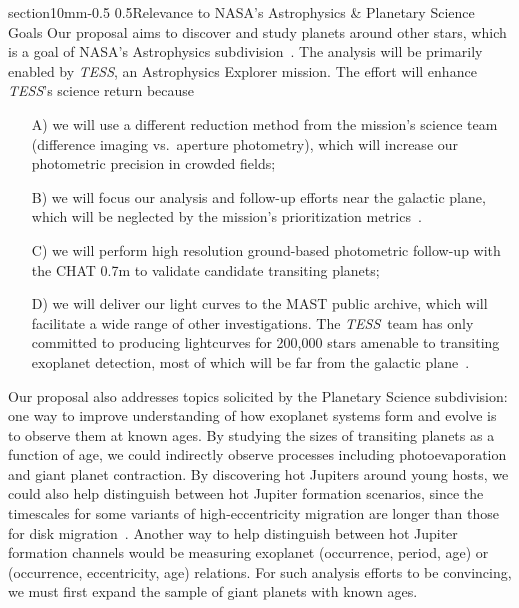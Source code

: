 \documentclass[letterpaper,11pt]{article}
\makeatletter
\renewcommand\section{\@startsection%
{section}{1}{0mm}{-0.5\baselineskip}%
{0.5\baselineskip}{\normalfont\normalsize\bfseries}}%
\newcommand{\tess}{{\it TESS}}
\makeatother
\begin{document}
\vspace{-0.3mm}
\section{Relevance to NASA's Astrophysics \& Planetary Science Goals}
\vspace{-0.3mm}
Our proposal aims to discover and study planets around other stars, 
which is a goal of NASA's Astrophysics 
subdivision~\citep[][Ch.~4.4]{NASA_strategic_2014}. 
The analysis will be primarily enabled by \tess, an Astrophysics Explorer 
mission.
The effort will enhance \tess's science return because
\begin{itemize}
\item[A)] we will use a different reduction method from the mission's 
science team (difference imaging vs.~aperture photometry),
which will increase our photometric precision in crowded fields;
\vspace{-0.4mm}
%
\item[B)] we will focus our analysis and follow-up efforts near the 
galactic plane, which will be neglected by the mission's prioritization 
metrics~\citep{Stassun_et_al_2017}. 
%
\item[C)] we will perform high resolution ground-based photometric follow-up 
with the CHAT 0.7m to validate candidate transiting planets;
%
\item[D)] we will deliver our light curves to the MAST public archive, 
which will facilitate a wide range of other investigations. The \tess\ team 
has only committed to producing lightcurves for 200,000 stars amenable to 
transiting exoplanet detection, most of which will be far from the galactic 
plane~\citep{Stassun_et_al_2017}. 
\vspace{-0.4mm}
%
\
\end{itemize}

Our proposal also addresses topics solicited by the Planetary Science 
subdivision: one way to improve understanding of how exoplanet systems form 
and evolve is to observe them at known ages. 
By studying the sizes of transiting planets as a function of age, 
we could indirectly observe processes including photoevaporation and giant 
planet contraction.
By discovering hot Jupiters around young hosts, we could also
help distinguish between hot Jupiter formation scenarios, since the timescales 
for some variants of high-eccentricity migration are longer than those for 
disk migration~\citep[\textit{e.g.},][]{dawson_origins_2018}.
Another way to help distinguish between hot Jupiter formation channels would 
be measuring exoplanet (occurrence, period, age) or (occurrence, eccentricity, 
age) relations. For such analysis efforts to be convincing, we must first 
expand the sample of giant planets with known ages.
\end{document}

